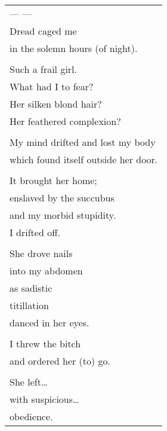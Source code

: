 \documentclass{article}
\begin{document}
\begin{tabular}{l}
\\
--- --- \\
Dread caged me \\
in the solemn hours (of night). \\
\\
Such a frail girl. \\
What had I to fear? \\
Her silken blond hair? \\
Her feathered complexion? \\
\\
My mind drifted and lost my body \\
which found itself outside her door. \\
\\
It brought her home; \\
enslaved by the succubus \\
and my morbid stupidity.
\\
I drifted off. \\
\\
She drove nails \\
into my abdomen \\
as sadistic \\
titillation \\
danced in her eyes. \\
\\
I threw the bitch \\
and ordered her (to) go. \\
\\
She left\ldots{} \\
with suspicious\ldots{} \\
obedience. \\
\end{tabular} \\
\end{document}
